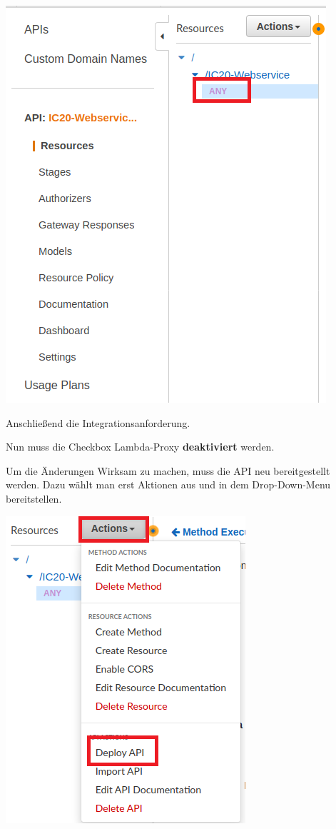 \documentclass{article}
\newcommand{\gquote}[1]{\glqq #1\grqq} %
\newcommand{\displayimage}[1]{\begin{center}\makebox[\textwidth]{\texttt{[image: \#1]}}\end{center}}
\begin{document}
\begin{center}
    \includegraphics[scale=0.7]{resources/aws_installation/select_any.png}
\end{center}
Anschließend die Integrationsanforderung.
\displayimage{resources/aws_installation/select_integration.png}
Nun muss die Checkbox Lambda-Proxy \textbf{deaktiviert} werden.
\displayimage{resources/aws_installation/select_proxy.png}
Um die Änderungen Wirksam zu machen, muss die API neu bereitgestellt werden. Dazu wählt man erst Aktionen aus und in dem Drop-Down-Menu \gquote{bereitstellen}.
\begin{center}
    \includegraphics[scale=0.7]{resources/aws_installation/select_deploy.png}
\end{center}
\end{document}

